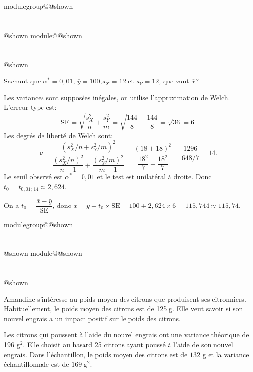 \documentclass{Evaluation}
\makeatletter
\newcommand{\currentmodulekey}{}
\newcommand{\currentmoduletitle}{}
\newcommand{\currentgroupkey}{}
\newcommand{\currentgrouptitle}{}
\newcommand{\showmoduleifneeded}{%
  \ifx\currentgroupkey\empty\else
    \expandafter\ifx\csname modulegroup@\currentgroupkey @shown\endcsname\relax
      \section*{\currentgrouptitle}%
      \expandafter\gdef\csname modulegroup@\currentgroupkey @shown\endcsname{1}%
    \fi
  \fi
  \expandafter\ifx\csname module@\currentmodulekey @shown\endcsname\relax
    \section*{\currentmoduletitle}%
    \expandafter\gdef\csname module@\currentmodulekey @shown\endcsname{1}%
  \fi
}
\newenvironment{H24}{\showmoduleifneeded}{}
\newenvironment{A24}{\showmoduleifneeded}{}
\makeatother
\begin{document}
\begin{questions}
\begin{H24}
Sachant que $\alpha^*=0,01$, $\overline{y}=100 $,$s_X=12$ et $s_Y=12$, que vaut $\overline{x}$?

\begin{solution}
Les variances sont supposées inégales, on utilise l'approximation de Welch. L'erreur-type est:
\[
\text{SE} = \sqrt{\frac{s_X^2}{n} + \frac{s_Y^2}{m}} = \sqrt{\frac{144}{8} + \frac{144}{8}} = \sqrt{36} = 6.
\]
Les degrés de liberté de Welch sont:
\[
\nu = \frac{(s_X^2/n + s_Y^2/m)^2}{\dfrac{(s_X^2/n)^2}{n-1} + \dfrac{(s_Y^2/m)^2}{m-1}} = \frac{(18+18)^2}{\dfrac{18^2}{7} + \dfrac{18^2}{7}} = \frac{1296}{648/7} = 14.
\]
Le seuil observé est $\alpha^* = 0{,}01$ et le test est unilatéral à droite. Donc $t_0 = t_{0{,}01;\,14} \approx 2{,}624$.

On a $t_0 = \dfrac{\bar{x} - \bar{y}}{\text{SE}}$, donc $\bar{x} = \bar{y} + t_0 \times \text{SE} = 100 + 2{,}624 \times 6 = 115{,}744 \approx 115{,}74$.
\end{solution}
\end{H24}

\begin{A24}
\question {} %
Amandine s'intéresse au poids moyen des citrons que produisent ses citronniers. Habituellement, le poids moyen des citrons est de 125 g.
Elle veut savoir si son nouvel engrais a un impact positif sur le poids des citrons.

Les citrons qui poussent à l'aide du nouvel engrais ont une variance théorique de 196 g$^2$. Elle choisit au hasard 25 citrons ayant poussé à l'aide de son nouvel engrais.
Dans l'échantillon, le poids moyen des citrons est de $132$ g et la variance échantillonnale est de $169$ g$^2$.

\end{A24}
\end{questions}
\end{document}
